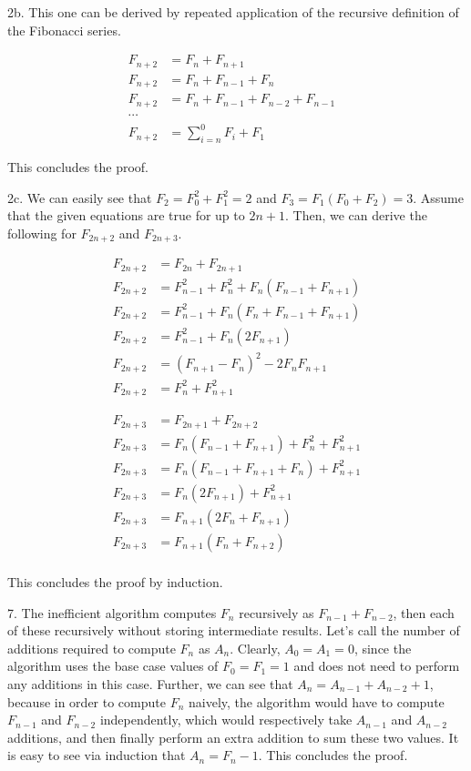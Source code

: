 \documentclass{article}
\begin{document}
2b. This one can be derived by repeated application of the recursive definition of the Fibonacci series.

\begin{align*}
    F_{n + 2} &= F_n + F_{n + 1} & \\
    F_{n + 2} &= F_n + F_{n - 1} + F_n \\
    F_{n + 2} &= F_n + F_{n - 1} + F_{n - 2} + F_{n - 1} \\
    \cdots \\
    F_{n + 2} &= \sum_{i = n}^0F_i + F_1
\end{align*}

This concludes the proof.

2c. We can easily see that $F_2 = F_0^2 + F_1^2 = 2$ and $F_3 = F_1(F_0 + F_2) = 3$. Assume that the given equations are true for up to $2n + 1$. Then, we can derive the following for $F_{2n + 2}$ and $F_{2n + 3}$.

\begin{align*}
    F_{2n + 2} &= F_{2n} + F_{2n + 1} \\
    F_{2n + 2} &= F_{n - 1}^2 + F_n^2 + F_n(F_{n - 1} + F_{n + 1}) \\
    F_{2n + 2} &= F_{n - 1}^2 + F_n(F_n + F_{n - 1} + F_{n + 1}) \\
    F_{2n + 2} &= F_{n - 1}^2 + F_n(2F_{n + 1}) \\
    F_{2n + 2} &= (F_{n + 1} - F_n)^2 - 2F_nF_{n + 1} \\
    F_{2n + 2} &= F_n^2 + F_{n + 1}^2
\end{align*}

\begin{align*}
    F_{2n + 3} &= F_{2n + 1} + F_{2n + 2} \\
    F_{2n + 3} &= F_n(F_{n - 1} + F_{n + 1}) + F_n^2 + F_{n + 1}^2 \\
    F_{2n + 3} &= F_n(F_{n - 1} + F_{n + 1} + F_n) + F_{n + 1}^2 \\
    F_{2n + 3} &= F_n(2F_{n + 1}) + F_{n + 1}^2 \\
    F_{2n + 3} &= F_{n + 1}(2F_n + F_{n + 1}) \\
    F_{2n + 3} &= F_{n + 1}(F_n + F_{n + 2}) \\
\end{align*}

This concludes the proof by induction.

7. The inefficient algorithm computes $F_n$ recursively as $F_{n - 1} + F_{n - 2}$, then each of these recursively without storing intermediate results. Let's call the number of additions required to compute $F_n$ as $A_n$. Clearly, $A_0 = A_1 = 0$, since the algorithm uses the base case values of $F_0 = F_1 = 1$ and does not need to perform any additions in this case. Further, we can see that $A_n = A_{n - 1} + A_{n - 2} + 1$, because in order to compute $F_n$ naively, the algorithm would have to compute $F_{n - 1}$ and $F_{n - 2}$ independently, which would respectively take $A_{n - 1}$ and $A_{n - 2}$ additions, and then finally perform an extra addition to sum these two values. It is easy to see via induction that $A_n = F_n - 1$. This concludes the proof.
\end{document}
